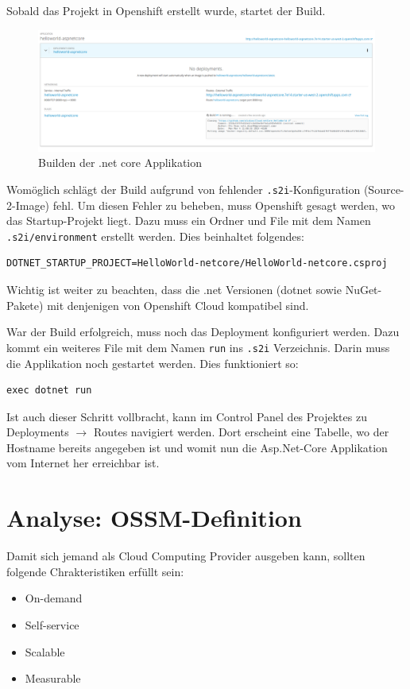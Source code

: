 \documentclass[12pt,a4paper]{article}
\begin{document}
Sobald das Projekt in Openshift erstellt wurde, startet der Build. 
\begin{figure}[h]
	\centering
	\includegraphics[width=0.7\linewidth]{img/os-building}
	\caption{Builden der .net core Applikation}
	\label{fig:os-building}
\end{figure}
Womöglich schlägt der Build aufgrund von fehlender \texttt{.s2i}-Konfiguration (Source-2-Image) fehl. Um diesen Fehler zu beheben, muss Openshift gesagt werden, wo das Startup-Projekt liegt. Dazu muss ein Ordner und File mit dem Namen \texttt{.s2i/environment} erstellt werden. Dies beinhaltet folgendes:
\begin{lstlisting}[breaklines=true]
DOTNET_STARTUP_PROJECT=HelloWorld-netcore/HelloWorld-netcore.csproj
\end{lstlisting}
Wichtig ist weiter zu beachten, dass die .net Versionen (dotnet sowie NuGet-Pakete) mit denjenigen von Openshift Cloud kompatibel sind. 

War der Build erfolgreich, muss noch das Deployment konfiguriert werden. Dazu kommt ein weiteres File mit dem Namen \texttt{run} ins \texttt{.s2i} Verzeichnis. Darin muss die Applikation noch gestartet werden. Dies funktioniert so:
\begin{lstlisting}
exec dotnet run
\end{lstlisting}
Ist auch dieser Schritt vollbracht, kann im Control Panel des Projektes zu Deployments $\rightarrow$ Routes navigiert werden. Dort erscheint eine Tabelle, wo der Hostname bereits angegeben ist und womit nun die Asp.Net-Core Applikation vom Internet her erreichbar ist.
\section{Analyse: OSSM-Definition}

Damit sich jemand als Cloud Computing Provider ausgeben kann, sollten folgende Chrakteristiken erfüllt sein:

\begin{itemize}
	\item On-demand
	\item Self-service
	\item Scalable
	\item Measurable
\end{itemize}
\end{document}
